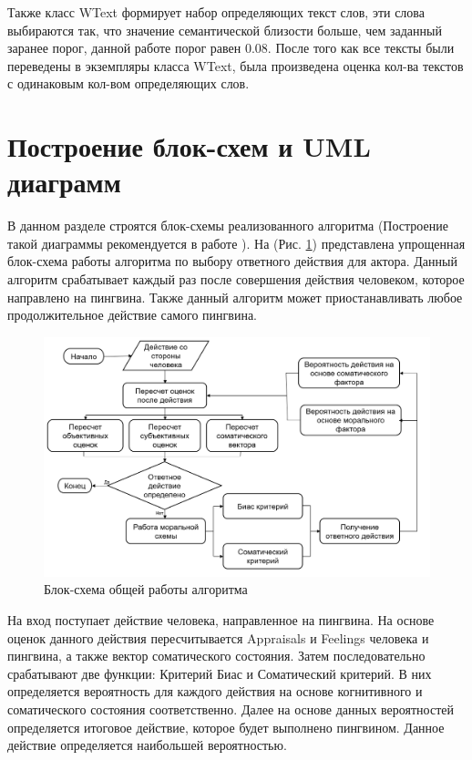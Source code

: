 Также класс WText формирует набор определяющих текст слов, эти слова выбираются так, что значение 
семантической близости больше, чем заданный заранее порог, данной работе порог равен 0.08. После 
того как все тексты были переведены в экземпляры класса WText, была произведена оценка кол-ва 
текстов с одинаковым кол-вом определяющих слов.

\section{Построение блок-схем и UML диаграмм}

В данном разделе строятся блок-схемы реализованного алгоритма (Построение такой диаграммы рекомендуется в работе \cite{OOP}).
На (Рис. \ref{pic:oldcmodel0}) представлена упрощенная блок-схема работы алгоритма по выбору ответного действия для актора.
Данный алгоритм срабатывает каждый раз после совершения действия человеком, которое направлено на пингвина.
Также данный алгоритм может приостанавливать любое продолжительное действие самого пингвина. 

\begin{figure}[h]
\includegraphics[width=0.75\columnwidth]{./img/oldcmodel0.png}
\centering
\caption{Блок-схема общей работы алгоритма}
\label{pic:oldcmodel0}
\end{figure}

На вход поступает действие человека, направленное на пингвина. На основе оценок данного действия пересчитывается Appraisals и Feelings человека и пингвина, а также 
вектор соматического состояния. Затем последовательно срабатывают две функции: Критерий Биас и Соматический критерий. 
В них определяется вероятность для каждого действия на основе когнитивного и соматического состояния соответственно.
Далее на основе данных вероятностей определяется итоговое действие, которое будет выполнено пингвином. 
Данное действие определяется наибольшей вероятностью. 

